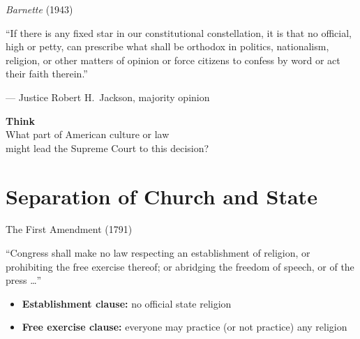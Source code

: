 \documentclass[aspectratio=169,11pt]{beamer}
\newenvironment{thinkframe}{%
  \begin{frame}[plain,noframenumbering,environment=thinkframe]\centering\Large}{\end{frame}}
\begin{document}
\begin{frame}{\emph{Barnette} (1943)}
  \vfill
  \begin{textquote}
    \Large ``If there is any fixed star in our constitutional constellation, it is that no official, high or petty, can prescribe what shall be orthodox in politics, nationalism, religion, or other matters of opinion or force citizens to confess by word or act their faith therein.''
  \end{textquote}
  \hfill --- Justice Robert H.\ Jackson, majority opinion
  \vfill
\end{frame}

\begin{thinkframe}
  {\color{oldred}\textbf{Think}}\\[0.8em]
  What part of American culture or law\\
  might lead the Supreme Court to this decision?
\end{thinkframe}

\section{Separation of Church and State}

\begin{frame}{The First Amendment (1791)}
  \vfill
  \begin{textquote}
    \Large ``Congress shall make no law respecting an \alert{establishment of religion}, or prohibiting the \alert{free exercise} thereof; or abridging the freedom of speech, or of the press \ldots''
  \end{textquote}
  \vfill
  \begin{itemize}
    \item \textbf{Establishment clause:} no official state religion
    \item \textbf{Free exercise clause:} everyone may practice (or not practice) any religion
  \end{itemize}
  \vfill
\end{frame}
\end{document}
